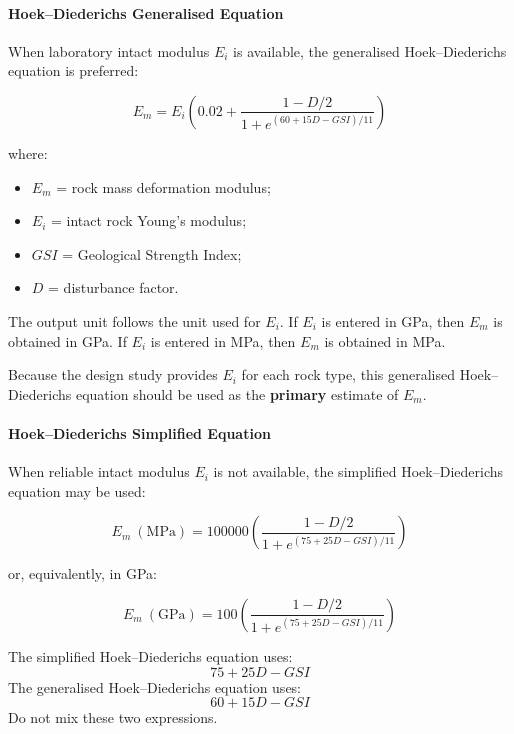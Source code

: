 \paragraph{Hoek--Diederichs Generalised Equation}

When laboratory intact modulus \(E_i\) is available, the generalised Hoek--Diederichs
equation is preferred:

\[
E_m =
E_i
\left(
0.02+
\frac{1-D/2}
{1+e^{(60+15D-GSI)/11}}
\right)
\]

where:
\begin{itemize}
 \item \(E_m\) = rock mass deformation modulus;
 \item \(E_i\) = intact rock Young's modulus;
 \item \(GSI\) = Geological Strength Index;
 \item \(D\) = disturbance factor.
\end{itemize}

\begin{notebox}[Units]
The output unit follows the unit used for \(E_i\). If \(E_i\) is entered in GPa, then
\(E_m\) is obtained in GPa. If \(E_i\) is entered in MPa, then \(E_m\) is obtained in MPa.
\end{notebox}

\begin{keybox}
Because the design study provides \(E_i\) for each rock type, this generalised
Hoek--Diederichs equation should be used as the \textbf{primary} estimate of \(E_m\).
\end{keybox}

\paragraph{Hoek--Diederichs Simplified Equation}

When reliable intact modulus \(E_i\) is not available, the simplified Hoek--Diederichs
equation may be used:

\[
E_m~(\text{MPa}) =
100000
\left(
\frac{1-D/2}
{1+e^{(75+25D-GSI)/11}}
\right)
\]

or, equivalently, in GPa:

\[
E_m~(\text{GPa}) =
100
\left(
\frac{1-D/2}
{1+e^{(75+25D-GSI)/11}}
\right)
\]

\begin{warnbox}
The simplified Hoek--Diederichs equation uses:
\[
75+25D-GSI
\]
The generalised Hoek--Diederichs equation uses:
\[
60+15D-GSI
\]
Do not mix these two expressions.
\end{warnbox}


